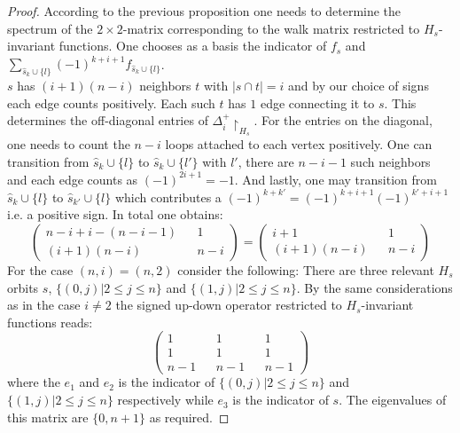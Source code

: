 \documentclass[11pt]{amsart}
\begin{document}
    \begin{proof}
        According to the previous proposition one needs to determine the spectrum of the $2\times 2$-matrix corresponding to the walk matrix restricted to $H_s$-invariant functions. One chooses as a basis the indicator of $f_s$ and $\sum_{\hat{s}_k\cup\{l\}}(-1)^{k+i+1}f_{\hat{s}_k\cup\{l\}}$.\\
        $s$ has $(i+1)(n-i)$ neighbors $t$ with $|s\cap t|=i$ and by our choice of signs each edge counts positively. Each such $t$ has $1$ edge connecting it to $s$. This determines the off-diagonal entries of $\Delta_i^+\restriction_{H_s}$. For the entries on the diagonal, one needs to count the $n-i$ loops attached to each vertex positively.
        One can transition from $\hat{s}_k\cup\{l\}$ to $\hat{s}_k\cup\{l'\}$ with $l'$, there are $n-i-1$ such neighbors and each edge counts as $(-1)^{2i+1}=-1$. And lastly, one may transition from $\hat{s}_k\cup\{l\}$ to $\hat{s}_{k'}\cup\{l\}$ which contributes a $(-1)^{k+k'}=(-1)^{k+i+1}(-1)^{k'+i+1}$ i.e. a positive sign. In total one obtains:
        \begin{equation}
            \begin{pmatrix}
                n-i+i-(n-i-1)&&1\\
                (i+1)(n-i)&&n-i              
            \end{pmatrix}=\begin{pmatrix}
                i+1&&1\\
                (i+1)(n-i)&&n-i              
            \end{pmatrix}
        \end{equation}
        For the case $(n,i)=(n,2)$ consider the following: There are three relevant $H_s$ orbits $s$, $\{(0,j)|2\leq j\leq n\}$ and $\{(1,j)|2\leq j\leq n\}$. By the same considerations as in the case $i\neq 2$ the signed up-down operator restricted to $H_s$-invariant functions reads:
        \begin{equation}
            \begin{pmatrix}
                1&&1&&1\\
                1&&1&&1\\
                n-1&&n-1&&n-1
            \end{pmatrix}
        \end{equation}
        where the $e_1$ and $e_2$ is the indicator of $\{(0,j)|2\leq j\leq n\}$ and $\{(1,j)|2\leq j\leq n\}$ respectively while $e_3$ is the indicator of $s$. The eigenvalues of this matrix are $\{0,n+1\}$ as required. 
    \end{proof}
\end{document}
